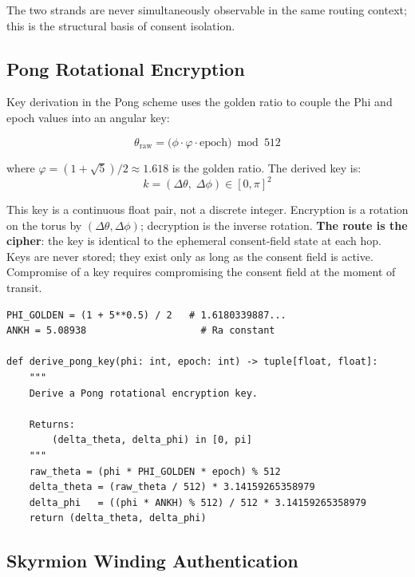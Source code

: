 \documentclass[11pt,a4paper]{article}
\begin{document}
The two strands are never simultaneously observable in the same routing context; this is the structural basis of consent isolation.

\subsection{Pong Rotational Encryption}

Key derivation in the Pong scheme uses the golden ratio to couple the Phi and epoch values into an angular key:

\begin{equation}
\theta_{\text{raw}} = \bigl(\phi \cdot \varphi \cdot \text{epoch}\bigr) \bmod 512
\label{eq:pong-derive}
\end{equation}

where $\varphi = (1+\sqrt{5})/2 \approx 1.618$ is the golden ratio. The derived key is:
\begin{equation}
k = (\Delta\theta,\; \Delta\phi) \in [0, \pi]^2
\label{eq:pong-key}
\end{equation}

This key is a continuous float pair, not a discrete integer. Encryption is a rotation on the torus by $(\Delta\theta, \Delta\phi)$; decryption is the inverse rotation. \textbf{The route is the cipher}: the key is identical to the ephemeral consent-field state at each hop. Keys are never stored; they exist only as long as the consent field is active. Compromise of a key requires compromising the consent field at the moment of transit.

\begin{lstlisting}[style=python,caption={Pong Key Derivation}]
PHI_GOLDEN = (1 + 5**0.5) / 2   # 1.6180339887...
ANKH = 5.08938                    # Ra constant

def derive_pong_key(phi: int, epoch: int) -> tuple[float, float]:
    """
    Derive a Pong rotational encryption key.

    Returns:
        (delta_theta, delta_phi) in [0, pi]
    """
    raw_theta = (phi * PHI_GOLDEN * epoch) % 512
    delta_theta = (raw_theta / 512) * 3.14159265358979
    delta_phi   = ((phi * ANKH) % 512) / 512 * 3.14159265358979
    return (delta_theta, delta_phi)
\end{lstlisting}

\subsection{Skyrmion Winding Authentication}
\end{document}
